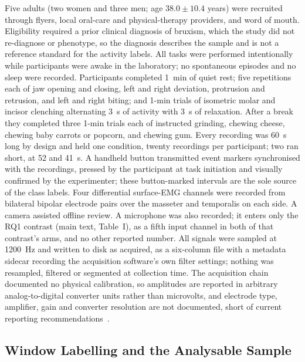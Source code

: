 \documentclass[journal]{IEEEtran}
\begin{document}
Five adults (two women and three men; age $38.0 \pm 10.4$ years) were recruited through flyers, local oral-care and physical-therapy providers, and word of mouth. Eligibility required a prior clinical diagnosis of bruxism, which the study did not re-diagnose or phenotype, so the diagnosis describes the sample and is not a reference standard for the activity labels. All tasks were performed intentionally while participants were awake in the laboratory; no spontaneous episodes and no sleep were recorded. Participants completed 1~min of quiet rest; five repetitions each of jaw opening and closing, left and right deviation, protrusion and retrusion, and left and right biting; and 1-min trials of isometric molar and incisor clenching alternating 3~s of activity with 3~s of relaxation. After a break they completed three 1-min trials each of instructed grinding, chewing cheese, chewing baby carrots or popcorn, and chewing gum. Every recording was 60~s long by design and held one condition, twenty recordings per participant; two ran short, at 52 and 41~s. A handheld button transmitted event markers synchronised with the recordings, pressed by the participant at task initiation and visually confirmed by the experimenter; these button-marked intervals are the sole source of the class labels. Four differential surface-EMG channels were recorded from bilateral bipolar electrode pairs over the masseter and temporalis on each side. A camera assisted offline review. A microphone was also recorded; it enters only the RQ1 contrast (main text, Table~I), as a fifth input channel in both of that contrast's arms, and no other reported number. All signals were sampled at 1200~Hz and written to disk as acquired, as a six-column file with a metadata sidecar recording the acquisition software's own filter settings; nothing was resampled, filtered or segmented at collection time. The acquisition chain documented no physical calibration, so amplitudes are reported in arbitrary analog-to-digital converter units rather than microvolts, and electrode type, amplifier, gain and converter resolution are not documented, short of current reporting recommendations~\cite{isek1999standards,besomi2019consensus}.

\subsection{Window Labelling and the Analysable Sample}
\end{document}
